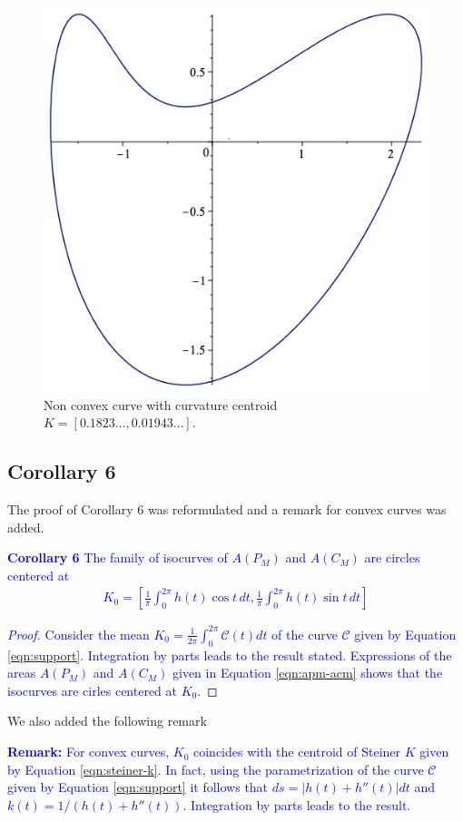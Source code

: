    \begin{figure}[H]
       \centering
   \includegraphics[scale=0.3]{pics/figura11.png}
       \caption{Non convex curve with curvature centroid  $K=[0.1823\ldots, 0.01943\ldots]$.}
       \label{fig:convex-curve}
   \end{figure}


\subsection{Corollary 6} The proof of Corollary 6 was reformulated and a remark for convex curves was added.


\textcolor{blue}{\textbf{Corollary 6} The family of isocurves of $A(P_M)$ and $A(C_M)$ are circles centered at
\begin{align*}
\label{eq:centroK}
K_0=\left[	\frac{1}{\pi} \int_0^{2\pi}\!\!\!\!\! h(t)\cos t \,dt,	\frac{1}{\pi} \int_0^{2\pi}\!\!\!\!\! h(t)\sin t \, dt\right]
\end{align*}
}

\textcolor{blue}{\begin{proof}  Consider the mean $K_0=\frac{1}{2\pi}\int_0^{2\pi}\mathcal{C}(t)dt$ of the curve $\mathcal{C}$ given by Equation \eqref{eqn:support}. Integration by parts leads to the result stated. Expressions of the areas $A(P_M)$ and $A(C_M)$ given in Equation \eqref{eqn:apm-acm} shows that the isocurves are cirles centered at $K_0$.
\end{proof}
}

We also added the following remark

\textcolor{blue}{\textbf{Remark: } For convex curves,  $K_0$ coincides with the   centroid of Steiner $K$ given by Equation \eqref{eqn:steiner-k}. In fact, using the parametrization  of the curve $\mathcal{C}$ given by Equation \eqref{eqn:support} it follows that $ds= |h(t)+h''(t)|dt$ and $k(t)=1/(h(t)+h''(t))$. Integration by parts leads to the result.}
